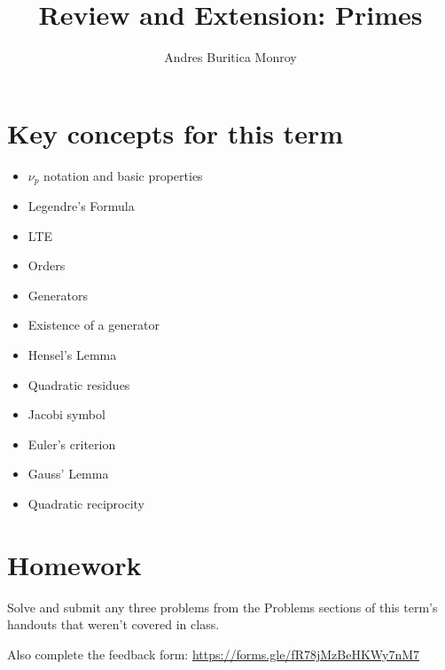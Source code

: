 \documentclass{article}
\title{Review and Extension: Primes}
\author{Andres Buritica Monroy}
\date{}
\begin{document}
\maketitle
\section{Key concepts for this term}
\begin{itemize}
	\item $\nu_p$ notation and basic properties
	\item Legendre's Formula
	\item LTE
	\item Orders
	\item Generators
	\item Existence of a generator
	\item Hensel's Lemma
	\item Quadratic residues
	\item Jacobi symbol
	\item Euler's criterion
	\item Gauss' Lemma
	\item Quadratic reciprocity
\end{itemize}
\section{Homework}
Solve and submit any three problems from the Problems sections of this term’s handouts that
weren’t covered in class.

Also complete the feedback form: \url{https://forms.gle/fR78jMzBeHKWy7nM7}
\end{document}
